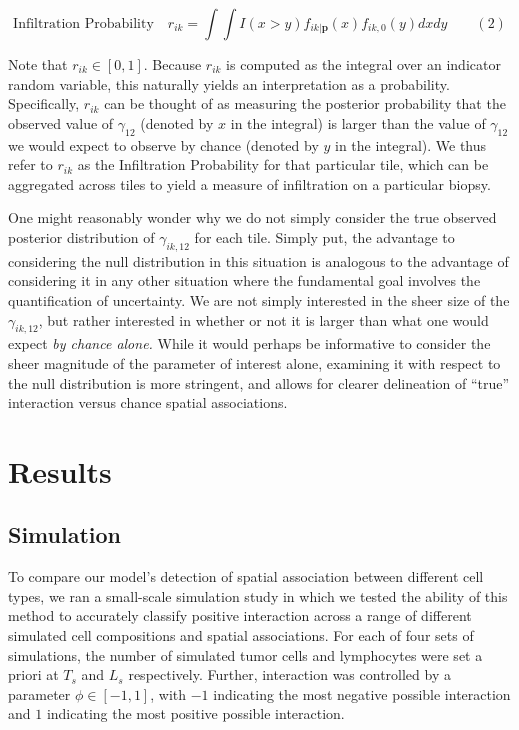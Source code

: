 \documentclass[
]{book}
\begin{document}
\[\text{Infiltration Probability} \quad r_{ik} = \int \int  I(x > y) f_{ik | \mathbf{p}}(x) f_{ik, 0}(y)  dxdy \qquad (2)\]

Note that \(r_{ik} \in [0, 1]\). Because \(r_{ik}\) is computed as the
integral over an indicator random variable, this naturally yields an
interpretation as a probability. Specifically, \(r_{ik}\) can be thought
of as measuring the posterior probability that the observed value of
\(\gamma_{12}\) (denoted by \(x\) in the integral) is larger than the value
of \(\gamma_{12}\) we would expect to observe by chance (denoted by \(y\) in
the integral). We thus refer to \(r_{ik}\) as the Infiltration Probability
for that particular tile, which can be aggregated across tiles to yield
a measure of infiltration on a particular biopsy.

One might reasonably wonder why we do not simply consider the true
observed posterior distribution of \(\gamma_{ik,12}\) for each tile.
Simply put, the advantage to considering the null distribution in this
situation is analogous to the advantage of considering it in any other
situation where the fundamental goal involves the quantification of
uncertainty. We are not simply interested in the sheer size of the
\(\gamma_{ik, 12}\), but rather interested in whether or not it is larger
than what one would expect \emph{by chance alone.} While it would perhaps be
informative to consider the sheer magnitude of the parameter of interest
alone, examining it with respect to the null distribution is more
stringent, and allows for clearer delineation of ``true'' interaction
versus chance spatial associations.

\hypertarget{results}{%
\chapter{Results}\label{results}}

\hypertarget{simulation}{%
\section{Simulation}\label{simulation}}

To compare our model's detection of spatial association between
different cell types, we ran a small-scale simulation study in which we
tested the ability of this method to accurately classify positive
interaction across a range of different simulated cell compositions and
spatial associations. For each of four sets of simulations, the number
of simulated tumor cells and lymphocytes were set a priori at \(T_s\) and
\(L_s\) respectively. Further, interaction was controlled by a parameter
\(\phi \in [-1, 1]\), with \(-1\) indicating the most negative possible
interaction and \(1\) indicating the most positive possible interaction.
\end{document}
